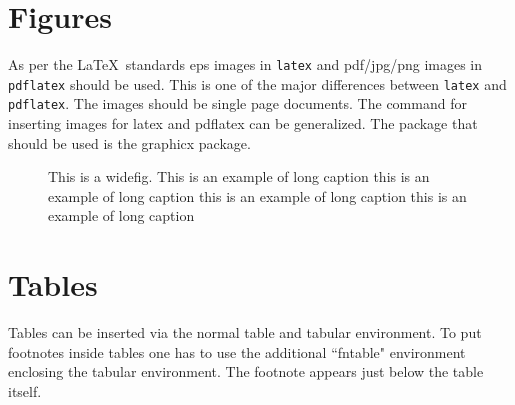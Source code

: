 \documentclass{CUP-JNL-DTM}%
\theoremstyle{definition}
\numberwithin{equation}{section}
\begin{document}
\section{Figures}

As per the \LaTeX\ standards eps images in \verb!latex! and pdf/jpg/png images in
\verb!pdflatex! should be used. This is one of the major differences between \verb!latex!
and \verb!pdflatex!. The images should be single page documents. The command for inserting images
for latex and pdflatex can be generalized. The package that should be used
is the graphicx package.

\begin{figure}[t]%
{\caption{This is a widefig. This is an example of long caption this is an example of long caption  this is an example of long caption this is an example of long caption}
\label{fig1}}
\end{figure}



\section{Tables}

Tables can be inserted via the normal table and tabular environment. To put
footnotes inside tables one has to use the additional ``fntable" environment
enclosing the tabular environment. The footnote appears just below the table
itself.
\end{document}
